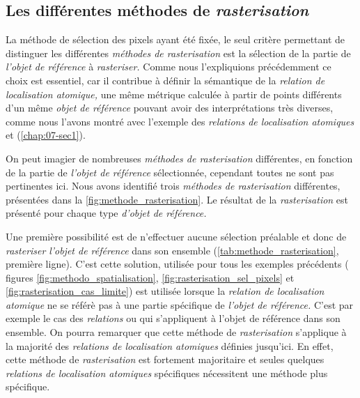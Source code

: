 \subsection{Les différentes méthodes de \emph{rasterisation}}

La méthode de sélection des pixels ayant été fixée, le seul critère
permettant de distinguer les différentes \emph{méthodes de
  rasterisation} est la sélection de la partie de \emph{l'objet de
  référence} à \emph{rasteriser.} Comme nous l'expliquions
précédemment ce choix est essentiel, car il contribue à définir la
sémantique de la \emph{relation de localisation atomique,} une même
métrique calculée à partir de points différents d'un même \emph{objet
  de référence} pouvant avoir des interprétations très diverses, comme
nous l'avons montré avec l'exemple des \emph{relations de localisation
  atomiques}  et
 (\autoref{chap:07-sec1}).

On peut imagier de nombreuses \emph{méthodes de rasterisation}
différentes, en fonction de la partie de \emph{l'objet de référence}
sélectionnée, cependant toutes ne sont pas pertinentes ici. Nous avons
identifié trois \emph{méthodes de rasterisation} différentes,
présentées dans la \ref{fig:methode_rasterisation}. Le résultat de la
\emph{rasterisation} est présenté pour chaque type \emph{d'objet de
  référence.}

Une première possibilité est de n'effectuer aucune sélection préalable
et donc de \emph{rasteriser} \emph{l'objet de référence} dans son
ensemble (\autoref{tab:methode_rasterisation}, première ligne). C'est
cette solution, utilisée pour tous les exemples précédents (\ie
figures \ref{fig:methodo_spatialisation},
\ref{fig:rasterisation_sel_pixels} et
\ref{fig:rasterisation_cas_limite}) est utilisée lorsque la
\emph{relation de localisation atomique} ne se référè pas à une partie
spécifique de \emph{l'objet de référence.} C'est par exemple le cas
des \emph{relations}  ou 
qui s'appliquent à l'objet de référence dans son ensemble. On pourra
remarquer que cette méthode de \emph{rasterisation} s'applique à la
majorité des \emph{relations de localisation atomiques} définies
jusqu'ici. En effet, cette méthode de \emph{rasterisation} est
fortement majoritaire et seules quelques \emph{relations de
  localisation atomiques} spécifiques nécessitent une méthode plus
spécifique.

